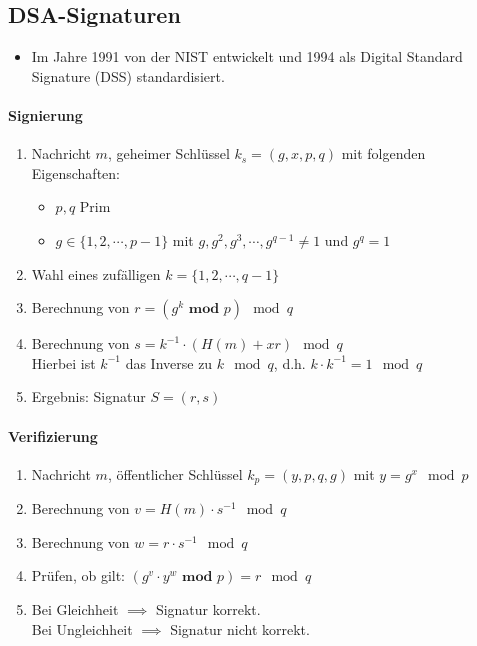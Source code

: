 \documentclass[a4paper, 11pt, accentcolor = tud3b]{tudreport}
\begin{document}
            \subsection{DSA-Signaturen}
	            \begin{itemize}
	            	\item Im Jahre 1991 von der NIST entwickelt und 1994 als Digital Standard Signature (DSS) standardisiert.
	            \end{itemize}
            
	            \paragraph{Signierung}
	                \begin{enumerate}
	                	\item[] Nachricht \(m\), geheimer Schlüssel \( k_s = (g, x, p, q) \) mit folgenden Eigenschaften:
		                	\begin{itemize}
			                	\item \( p, q \) Prim
		                		\item \( g \in \{ 1, 2, \cdots, p - 1 \} \) mit \( g, g^2, g^3, \cdots, g^{q - 1} \neq 1 \) und \( g^q = 1 \)
		                	\end{itemize}
	                	\item Wahl eines zufälligen \( k = \{ 1, 2, \cdots, q - 1 \} \)
	                	\item Berechnung von \( r = (g^k \textbf{ mod } p) \mod q \)
	                	\item Berechnung von \( s = k^{-1} \cdot (H(m) + xr) \mod q \) \\ Hierbei ist \(k^{-1}\) das Inverse zu \(k \mod q\), d.h. \( k \cdot k^{-1} = 1 \mod q \)
	                	\item Ergebnis: Signatur \( S = (r, s) \)
	                \end{enumerate}
				
				\paragraph{Verifizierung}
					\begin{enumerate}
						\item[] Nachricht \(m\), öffentlicher Schlüssel \(k_p = (y, p, q, g)\) mit \( y = g^x \mod p \)
						\item Berechnung von \( v = H(m) \cdot s^{-1} \mod q \)
						\item Berechnung von \( w = r \cdot s^{-1} \mod q \)
						\item Prüfen, ob gilt: \( (g^v \cdot y^w \textbf{ mod } p) = r \mod q \)
						\item Bei Gleichheit \(\implies\) Signatur korrekt. \\
						      Bei Ungleichheit \(\implies\) Signatur nicht korrekt.
					\end{enumerate}
				
\end{document}
